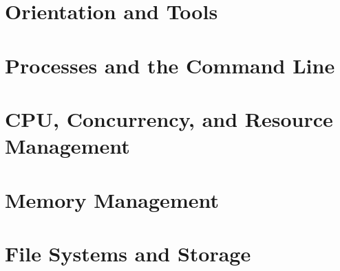 \documentclass[11pt,oneside,a4paper]{report}
\begin{document}
\utpfrontmatter

\part{Orientation and Tools}



\part{Processes and the Command Line}









\part{CPU, Concurrency, and Resource Management}









\part{Memory Management}






\part{File Systems and Storage}







\end{document}
